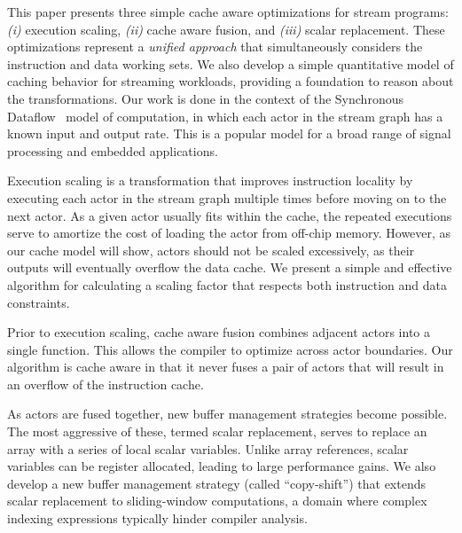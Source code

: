 
This paper presents three simple cache aware optimizations for stream
programs: {\it (i)} execution scaling, {\it (ii)} cache aware fusion,
and {\it (iii)} scalar replacement.  These optimizations represent a
{\it unified approach} that simultaneously considers the instruction
and data working sets.  We also develop a simple quantitative model of
caching behavior for streaming workloads, providing a foundation to
reason about the transformations.  Our work is done in the context of
the Synchronous Dataflow~\cite{LM87-i} model of computation, in which
each actor in the stream graph has a known input and output rate.  This
is a popular model for a broad range of signal processing and embedded
applications.

Execution scaling is a transformation that improves instruction
locality by executing each actor in the stream graph multiple times
before moving on to the next actor.  As a given actor usually fits
within the cache, the repeated executions serve to amortize the cost
of loading the actor from off-chip memory.  However, as our cache
model will show, actors should not be scaled excessively, as their
outputs will eventually overflow the data cache.  We present a simple
and effective algorithm for calculating a scaling factor that respects
both instruction and data constraints.

Prior to execution scaling, cache aware fusion combines adjacent
actors into a single function.  This allows the compiler to optimize
across actor boundaries.  Our algorithm is cache aware in that it
never fuses a pair of actors that will result in an overflow of the
instruction cache.

As actors are fused together, new buffer management strategies become
possible.  The most aggressive of these, termed scalar replacement,
serves to replace an array with a series of local scalar variables.
Unlike array references, scalar variables can be register allocated,
leading to large performance gains.  We also develop a new buffer
management strategy (called ``copy-shift'') that extends scalar
replacement to sliding-window computations, a domain where complex
indexing expressions typically hinder compiler analysis.

